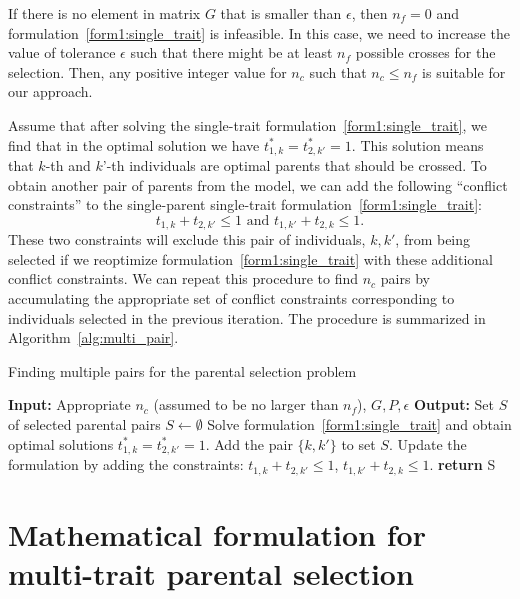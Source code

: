 \documentclass[12pt, a4paper, bibliography=totoc]{scrartcl}
\begin{document}
If there is no element in matrix $G$ that is smaller than $\epsilon$, then  $n_f=0$ and formulation~\eqref{form1:single_trait} is infeasible. In this case, we need to increase the value of tolerance $\epsilon$ such that there might be at least $n_f$ possible crosses for the selection. Then, any positive integer value for $n_c$ such that $n_c \leq n_f$ is suitable for our approach. 

Assume that after solving the single-trait formulation~\eqref{form1:single_trait}, we find that in the optimal solution we have $t^*_{1,k}=t^*_{2,k'}=1$. This solution means that $k$-th and $k$'-th individuals are optimal parents that should be crossed. To obtain another pair of parents from the model, we can add the following ``conflict constraints'' to the single-parent single-trait formulation~\eqref{form1:single_trait}:
\begin{equation}
    	 t_{1,k}+t_{2,k'} \leq 1 \text{ and } t_{1,k'}+t_{2,k} \leq 1. \label{eq:MP_constr}
\end{equation}
These two constraints will exclude this  pair of individuals, $k, k'$, from being selected if we reoptimize formulation~\eqref{form1:single_trait} with these additional conflict constraints. We can repeat this procedure to find $n_{c}$ pairs by accumulating the appropriate set of conflict constraints corresponding to individuals selected in the previous iteration. The procedure is summarized in Algorithm~\ref{alg:multi_pair}.

\begin{algorithm}[!ht]
\caption{\label{alg:multi_pair}Finding multiple pairs for the parental selection problem}
\begin{algorithmic}[1]
\STATE \textbf{Input:} Appropriate $n_c$ (assumed to be no larger than $n_f$), $G, P, \epsilon$
\STATE \textbf{Output:} Set $S$ of selected parental pairs
\STATE $S \gets \emptyset$
\STATE Solve formulation~\eqref{form1:single_trait} and obtain optimal solutions $t^*_{1,k}=t^*_{2,k'}=1$.
\STATE Add the pair $\{k,k'\}$ to set $S$.
\STATE Update the formulation by adding the constraints: $t_{1,k}+t_{2,k'} \leq 1$, $t_{1,k'}+t_{2,k} \leq 1$.
\ENDWHILE
\STATE \textbf{return} S
\end{algorithmic}
\end{algorithm}


\section*{Mathematical formulation for multi-trait parental selection}
\end{document}

